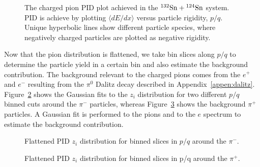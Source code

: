 \begin{figure}[!htb]%
    \centering
    \qquad
 	\caption{The charged pion PID plot achieved in the ${}^{132}\mathrm{Sn} + {}^{124}\mathrm{Sn}$ system. PID is achieve by plotting $\langle dE/dx\rangle$ versus particle rigidity, $p/q$. Unique hyperbolic lines show different particle species, where negatively charged particles are plotted as negative rigidity.  }
	\label{fig:pidpion}
\end{figure}


Now that the pion distribution is flattened, we take bin slices along $p/q$ to determine the particle yield in a certain bin and also estimate the background contribution. The background relevant to  the charged pions comes from the $e^+$ and $e^-$ resulting from the $\pi^0$ Dalitz decay described in Appendix~\ref{appen:dalitz}. Figure~\ref{fig:pimmom_flat} shows the Gaussian fits to the $z_i$ distribution for two different $p/q$ binned cuts around the $\pi^-$ particles, whereas Figure~\ref{fig:pipmom_flat} shows the background $\pi^+$ particles. A Gaussian fit is performed to the pions and to the $e$ spectrum to estimate the background contribution. 

\begin{figure}[!htb]%
    \centering
    \qquad

    \caption{Flattened PID $z_i$ distribution for binned slices in $p/q$ around the $\pi^-$.}
	\label{fig:pimmom_flat}
\end{figure}


\begin{figure}[!htb]%
    \centering
    \qquad
 	\caption{Flattened PID $z_i$ distribution  for binned slices in p/q around the $\pi^+$.}
	\label{fig:pipmom_flat}
\end{figure}


